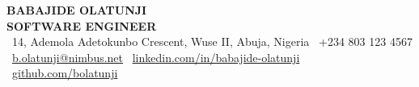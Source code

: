 \documentclass[10pt,a4paper]{article}
\begin{document}
\begin{tcolorbox}[
    colback=primary,
    colframe=primary,
    arc=4px,
    left=10pt,
    right=10pt,
    top=12pt,
    bottom=12pt,
    boxrule=0pt
]
    \begin{center}
        \color{white}
        {\Huge \bfseries \sffamily BABAJIDE OLATUNJI} \\[4pt]
        {\large \bfseries \sffamily SOFTWARE ENGINEER} \\[10pt]
        \small
        \faMapMarker\ 14, Ademola Adetokunbo Crescent, Wuse II, Abuja, Nigeria \quad \textperiodcentered \quad \faPhone\ +234 803 123 4567 \\
        \faEnvelope\ \href{mailto:b.olatunji@nimbus.net}{\color{white}b.olatunji@nimbus.net} \quad \textperiodcentered \quad \faLinkedin\ \href{https://linkedin.com/in/babajide-olatunji}{\color{white}linkedin.com/in/babajide-olatunji} \quad \textperiodcentered \quad \faGithub\ \href{https://github.com/bolatunji}{\color{white}github.com/bolatunji}
    \end{center}
\end{tcolorbox}

\vspace{0.4cm}
\end{document}
